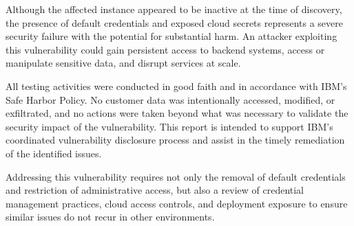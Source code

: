 \documentclass[12pt,a4paper]{report}
\begin{document}
Although the affected instance appeared to be inactive at the time of discovery, the presence of default credentials and exposed cloud secrets represents a severe security failure with the potential for substantial harm. An attacker exploiting this vulnerability could gain persistent access to backend systems, access or manipulate sensitive data, and disrupt services at scale.

All testing activities were conducted in good faith and in accordance with IBM’s Safe Harbor Policy. No customer data was intentionally accessed, modified, or exfiltrated, and no actions were taken beyond what was necessary to validate the security impact of the vulnerability. This report is intended to support IBM’s coordinated vulnerability disclosure process and assist in the timely remediation of the identified issues.

Addressing this vulnerability requires not only the removal of default credentials and restriction of administrative access, but also a review of credential management practices, cloud access controls, and deployment exposure to ensure similar issues do not recur in other environments.

\end{document}
